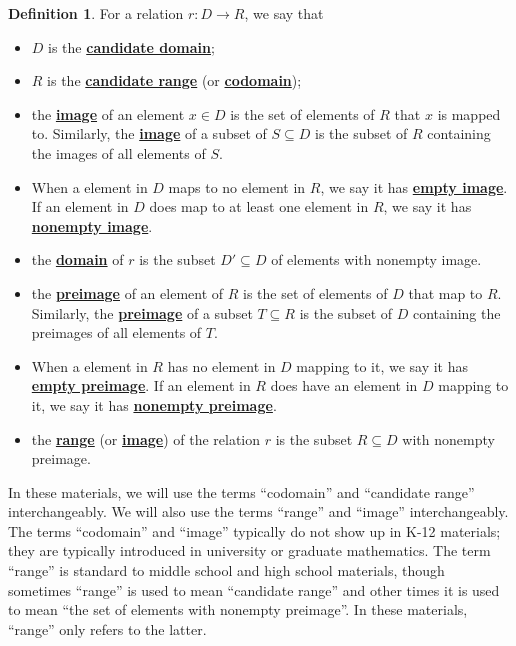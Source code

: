 \documentclass[11pt]{article}
\renewcommand\subset\subseteq
\renewcommand\emph[1]{\underline{\bf{#1}}} %
\theoremstyle{definition}
\newtheorem{definition}[theorem]{Definition}
\begin{document}
\begin{definition}\label{d: candidate domain etc}
For a relation $r:D \to R$, we say that 
	\begin{itemize}
	\item $D$ is the \emph{candidate domain};
	\item $R$ is the \emph{candidate range} (or \emph{codomain});
	\item the \emph{image} of an element $x\in  D$ is the set of elements of $R$ that $x$ is mapped to. Similarly, the \emph{image} of a subset of $S\subset D$ is the subset of $R$ containing the images of all elements of $S$.
	\item When a element in $D$ maps to no element in $R$, we say it has \emph{empty image}. If an element in $D$ does map to at least one element in $R$, we say it has \emph{nonempty image}.
	\item the \emph{domain} of $r$ is the subset $D'\subset D$ of elements with nonempty image.
	\item the \emph{preimage} of an element of $R$ is the set of elements of $D$ that map to $R$. Similarly, the \emph{preimage} of a subset $T\subset R$ is the subset of $D$ containing the preimages of all elements of $T$.
	\item When a element in $R$ has no element in $D$ mapping to it, we say it has \emph{empty preimage}. If an element in $R$ does have an element in $D$ mapping to it, we say it has \emph{nonempty preimage}.
	\item the \emph{range} (or \emph{image}) of the relation $r$ is the subset $R\subset D$ with nonempty preimage.
	\end{itemize}
\end{definition}

\begin{note}
In these materials, we will use the terms ``codomain'' and ``candidate range'' interchangeably. We will also use the terms ``range'' and ``image'' interchangeably. The terms ``codomain'' and ``image'' typically do not show up in K-12 materials; they are typically introduced in university or graduate mathematics. The term ``range'' is standard to middle school and high school materials, though sometimes ``range'' is used to mean ``candidate range'' and other times it is used to mean ``the set of elements with nonempty preimage''. In these materials, ``range'' only refers to the latter.
\end{note}
\end{document}

